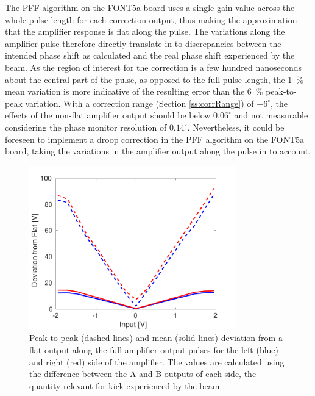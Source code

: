 The PFF algorithm on the FONT5a board uses a single gain value across the whole pulse length for each correction output, thus making the approximation that the amplifier response is flat along the pulse. The variations along the amplifier pulse therefore directly translate in to discrepancies between the intended phase shift as calculated and the real phase shift experienced by the beam. As the region of interest for the correction is a few hundred nanoseconds about the central part of the pulse, as opposed to the full pulse length, the 1~\% mean variation is more indicative of the resulting error than the 6~\% peak-to-peak variation. With a correction range (Section \ref{ss:corrRange}) of \(\pm6^\circ\), the effects of the non-flat amplifier output should be below \(0.06^\circ\) and not measurable considering the phase monitor resolution of \(0.14^\circ\). Nevertheless, it could be foreseen to implement a droop correction in the PFF algorithm on the FONT5a board, taking the variations in the amplifier output along the pulse in to account.

\begin{figure}
  \centering
  \includegraphics[width=0.8\textwidth]{Figures/commissioning/AmpFlatness}
  \caption{Peak-to-peak (dashed lines) and mean (solid lines) deviation from a flat output along the full amplifier output pulses for the left (blue) and right (red) side of the amplifier. The values are calculated using the difference between the A and B outputs of each side, the quantity relevant for kick experienced by the beam.}
  \label{f:ampFlatness}
\end{figure}

